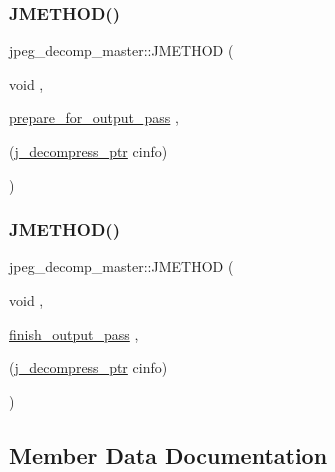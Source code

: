 \subsubsection{\texorpdfstring{JMETHOD()}{JMETHOD()}\hspace{0.1cm}{\footnotesize\ttfamily [1/2]}}
{\footnotesize\ttfamily jpeg\+\_\+decomp\+\_\+master\+::\+J\+M\+E\+T\+H\+OD (\begin{DoxyParamCaption}\item[{void}]{,  }\item[{\mbox{\hyperlink{jdmaster_8c_a67420f4157afdc9fdf730941dbaf8503}{prepare\+\_\+for\+\_\+output\+\_\+pass}}}]{,  }\item[{(\mbox{\hyperlink{jpeglib_8h_a00c7d78af44bd26a901c791ccfc1e178}{j\+\_\+decompress\+\_\+ptr}} cinfo)}]{ }\end{DoxyParamCaption})}

\mbox{\label{structjpeg__decomp__master_a7dec615b828e443ddddf99078d1edb9a}} 
\subsubsection{\texorpdfstring{JMETHOD()}{JMETHOD()}\hspace{0.1cm}{\footnotesize\ttfamily [2/2]}}
{\footnotesize\ttfamily jpeg\+\_\+decomp\+\_\+master\+::\+J\+M\+E\+T\+H\+OD (\begin{DoxyParamCaption}\item[{void}]{,  }\item[{\mbox{\hyperlink{jdmaster_8c_a38d4530fe1a7a3442c983735c656dfd0}{finish\+\_\+output\+\_\+pass}}}]{,  }\item[{(\mbox{\hyperlink{jpeglib_8h_a00c7d78af44bd26a901c791ccfc1e178}{j\+\_\+decompress\+\_\+ptr}} cinfo)}]{ }\end{DoxyParamCaption})}



\subsection{Member Data Documentation}
\mbox{\label{structjpeg__decomp__master_a93cbde036bd87ab00b0ac8214e27bbe1}} 
